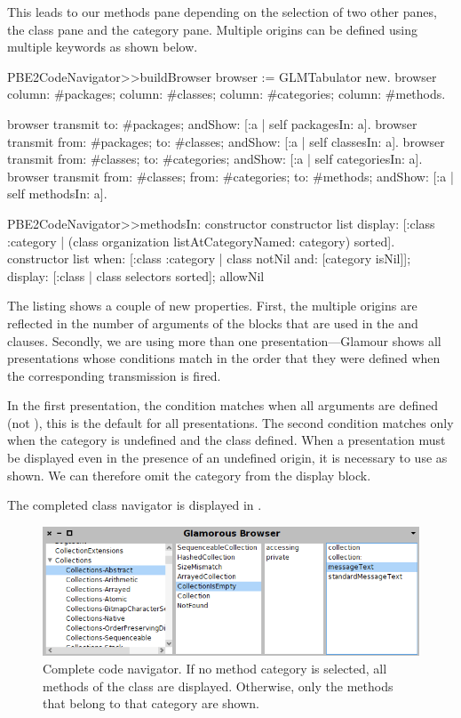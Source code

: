 \documentclass[a4paper,10pt,twoside]{book}
\begin{document}
This leads to our methods pane depending on the selection of two other
panes, the class pane and the category pane. Multiple origins can be
defined using multiple  keywords as shown below.

\begin{code}{}
PBE2CodeNavigator>>buildBrowser
  browser := GLMTabulator new.
  browser
    column: #packages;
    column: #classes;
    column: #categories;
    column: #methods.

  browser transmit to: #packages; andShow: [:a | self packagesIn: a].
  browser transmit from: #packages; to: #classes; andShow: [:a | self classesIn: a].
  browser transmit from: #classes; to: #categories; andShow: [:a | self categoriesIn: a].
  browser transmit from: #classes; from: #categories; to: #methods; 
  		andShow: [:a | self methodsIn: a].

PBE2CodeNavigator>>methodsIn: constructor
  constructor list
    display: [:class :category | 
    			(class organization listAtCategoryNamed: category) sorted].
  constructor list
    when: [:class :category | class notNil and: [category isNil]];
    display: [:class | class selectors sorted];
    allowNil
\end{code}


The listing shows a couple of new properties. First, the multiple origins are reflected in the number of
arguments of the blocks that are used in the  and
 clauses. Secondly, we are using more than one
presentation---Glamour shows all presentations whose conditions match in
the order that they were defined when the corresponding transmission
is fired.

In the first presentation, the condition matches when all arguments
are defined (not ), this is the default for all presentations. The
second condition matches only when the category is undefined and the class defined. When a presentation must be displayed even in the
presence of an undefined origin, it is necessary to use  as
shown. We can therefore omit the category from the display block.

The completed class navigator is displayed in .

\begin{figure}[htbp]
\centerline{\includegraphics[width=\linewidth]{codenavigator.png}}
\caption{Complete code navigator. If no method category is selected, all methods of the class
are displayed. Otherwise, only the methods that belong to that category are shown.}
\label{fig:codenavigator}
\end{figure}
\end{document}
